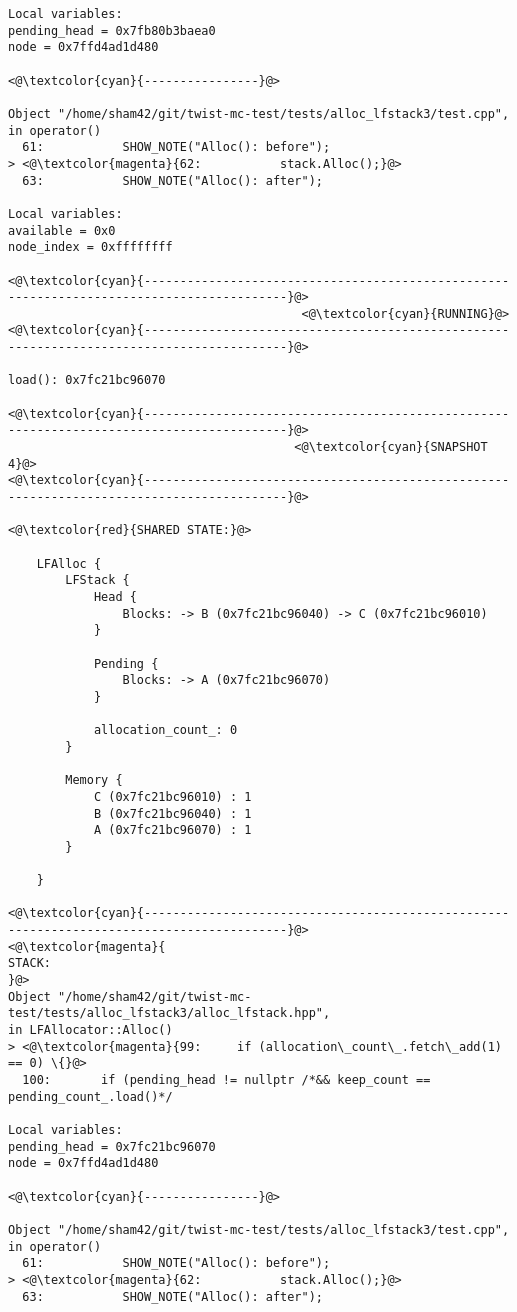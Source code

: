 \begin{adjustwidth}{-3.3cm}{-1cm}
\begin{allintypewriter}
\begin{multicols*}{2}
\begin{lstlisting}[numbers=none]
Local variables: 
pending_head = 0x7fb80b3baea0
node = 0x7ffd4ad1d480

<@\textcolor{cyan}{----------------}@>

Object "/home/sham42/git/twist-mc-test/tests/alloc_lfstack3/test.cpp",
in operator()
  61:           SHOW_NOTE("Alloc(): before");
> <@\textcolor{magenta}{62:           stack.Alloc();}@>
  63:           SHOW_NOTE("Alloc(): after");

Local variables: 
available = 0x0
node_index = 0xffffffff

<@\textcolor{cyan}{------------------------------------------------------------------------------------------}@>
                                         <@\textcolor{cyan}{RUNNING}@>
<@\textcolor{cyan}{------------------------------------------------------------------------------------------}@>

load(): 0x7fc21bc96070

<@\textcolor{cyan}{------------------------------------------------------------------------------------------}@>
                                        <@\textcolor{cyan}{SNAPSHOT 4}@>
<@\textcolor{cyan}{------------------------------------------------------------------------------------------}@>

<@\textcolor{red}{SHARED STATE:}@>

    LFAlloc {
	    LFStack {
		    Head {
			    Blocks: -> B (0x7fc21bc96040) -> C (0x7fc21bc96010) 
		    }

		    Pending {
			    Blocks: -> A (0x7fc21bc96070) 
		    }

		    allocation_count_: 0
	    }

	    Memory {
		    C (0x7fc21bc96010) : 1
		    B (0x7fc21bc96040) : 1
		    A (0x7fc21bc96070) : 1
	    }

    }

<@\textcolor{cyan}{------------------------------------------------------------------------------------------}@>
<@\textcolor{magenta}{
STACK:
}@>
Object "/home/sham42/git/twist-mc-test/tests/alloc_lfstack3/alloc_lfstack.hpp",
in LFAllocator::Alloc()
> <@\textcolor{magenta}{99:     if (allocation\_count\_.fetch\_add(1) == 0) \{}@>
  100:       if (pending_head != nullptr /*&& keep_count == pending_count_.load()*/

Local variables: 
pending_head = 0x7fc21bc96070
node = 0x7ffd4ad1d480

<@\textcolor{cyan}{----------------}@>

Object "/home/sham42/git/twist-mc-test/tests/alloc_lfstack3/test.cpp",
in operator()
  61:           SHOW_NOTE("Alloc(): before");
> <@\textcolor{magenta}{62:           stack.Alloc();}@>
  63:           SHOW_NOTE("Alloc(): after");


\end{lstlisting}
\end{multicols*}
\end{allintypewriter}
\end{adjustwidth}

